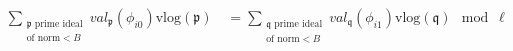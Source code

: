 \documentclass[preview]{standalone}
\begin{document}
\begin{align*}
\sum_{\substack{\mathfrak{p} \text{ prime ideal} \\ \text{of norm} < B}} val_{\mathfrak{p}}(\phi_{i0}) \mathrm{vlog} \left( \mathfrak{p} \right) \quad = \sum_{\substack{\mathfrak{q} \text{ prime ideal} \\ \text{of norm} < B}} val_{\mathfrak{q}}(\phi_{i1}) \mathrm{vlog} \left( \mathfrak{q} \right) \mod \ell
\end{align*}
\end{document}
